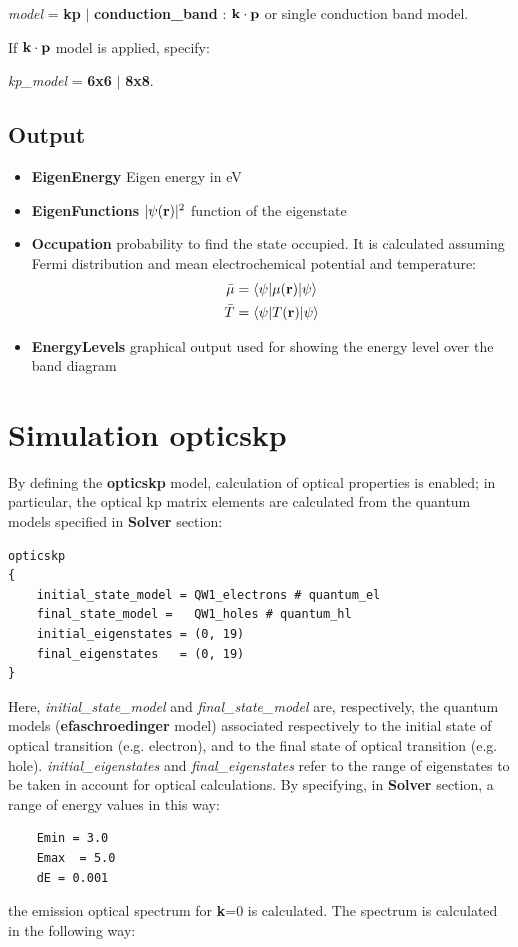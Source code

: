 

\textit{model} = \textbf{kp} $\vert$ \textbf{conduction\_band} :  ${\bf k\cdot p}$  or  single  conduction band model.

If ${\bf k\cdot p}$ model is  applied, specify:

\textit{kp\_model} = \textbf{6x6} $\vert$   \textbf{8x8}.

\section{Output}
\begin{itemize}
 \item {\textbf{EigenEnergy}} Eigen energy in eV
 \item {\textbf{EigenFunctions}} $|\psi({\bf r})|^2$ function of the eigenstate
 \item {\textbf{Occupation}} probability to find the state occupied. It is calculated 
assuming Fermi distribution and mean electrochemical potential and temperature: 
\begin{gather}
\bar \mu = \langle \psi|\mu({\bf r})|\psi \rangle \\
\bar T = \langle \psi|T({\bf r})|\psi \rangle 
\end{gather}
 \item {\textbf{EnergyLevels}} graphical output used for showing the energy 
level over the band diagram 
\end{itemize}



\chapter{Simulation opticskp}

By defining  the  \textbf{opticskp}  model,  calculation of  optical  properties  is  enabled; in particular, the  optical kp matrix elements are calculated from the  quantum models specified in \textbf{Solver} section:
\begin{verbatim}
opticskp
{
    initial_state_model = QW1_electrons # quantum_el
    final_state_model =   QW1_holes # quantum_hl
    initial_eigenstates = (0, 19)
    final_eigenstates   = (0, 19)
}
\end{verbatim}


Here, \textit{initial\_state\_model}  and \textit{final\_state\_model} are, respectively, the quantum models (\textbf{efaschroedinger} model) associated respectively  to the initial state of optical transition (e.g. electron), and  to the final state of optical transition (e.g. hole).
\textit{initial\_eigenstates} and \textit{final\_eigenstates}  refer to the range of  eigenstates to be taken in account for  optical calculations. 
By specifying, in \textbf{Solver} section, a  range of energy values in this  way:
\begin{verbatim}
    Emin = 3.0
    Emax  = 5.0
    dE = 0.001
\end{verbatim}
the  emission optical  spectrum for  \textbf{k}=0 is  calculated.
The spectrum is calculated in the following way:

